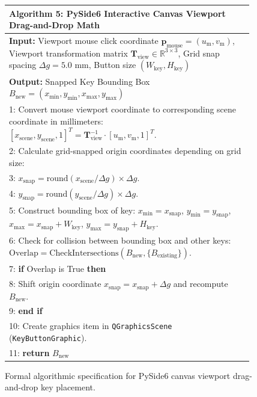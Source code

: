 \begin{figure}[htbp]
\centering
\begin{minipage}{0.92\textwidth}
\small
\setlength{\extrarowheight}{2pt}
\begin{tabular}{|p{0.96\linewidth}|}
\hline
\textbf{Algorithm 5: PySide6 Interactive Canvas Viewport Drag-and-Drop Math} \\
\hline
{\small\sffamily \textbf{Input:} Viewport mouse click coordinate $\mathbf{p}_{\text{mouse}} = (u_{\text{m}}, v_{\text{m}})$, Viewport transformation matrix $\mathbf{T}_{\text{view}} \in \mathbb{R}^{3 \times 3}$, Grid snap spacing $\Delta g = 5.0\text{ mm}$, Button size $(W_{\text{key}}, H_{\text{key}})$} \\
{\small\sffamily \textbf{Output:} Snapped Key Bounding Box $B_{\text{new}} = (x_{\min}, y_{\min}, x_{\max}, y_{\max})$} \\
{\small 1: Convert mouse viewport coordinate to corresponding scene coordinate in millimeters: $[x_{\text{scene}}, y_{\text{scene}}, 1]^T = \mathbf{T}_{\text{view}}^{-1} \cdot [u_{\text{m}}, v_{\text{m}}, 1]^T$.} \\
{\small 2: Calculate grid-snapped origin coordinates depending on grid size:} \\
{\small 3: \hspace{1em} $x_{\text{snap}} = \text{round}(x_{\text{scene}} / \Delta g) \times \Delta g$.} \\
{\small 4: \hspace{1em} $y_{\text{snap}} = \text{round}(y_{\text{scene}} / \Delta g) \times \Delta g$.} \\
{\small 5: Construct bounding box of key: $x_{\min} = x_{\text{snap}}$, $y_{\min} = y_{\text{snap}}$, $x_{\max} = x_{\text{snap}} + W_{\text{key}}$, $y_{\max} = y_{\text{snap}} + H_{\text{key}}$.} \\
{\small 6: Check for collision between bounding box and other keys: $\text{Overlap} = \text{CheckIntersections}(B_{\text{new}}, \{B_{\text{existing}}\})$.} \\
{\small 7: \textbf{if} Overlap is True \textbf{then}} \\
{\small 8: \hspace{1em} Shift origin coordinate $x_{\text{snap}} = x_{\text{snap}} + \Delta g$ and recompute $B_{\text{new}}$.} \\
{\small 9: \textbf{end if}} \\
{\small 10: Create graphics item in \texttt{QGraphicsScene} (\texttt{KeyButtonGraphic}).} \\
{\small 11: \textbf{return} $B_{\text{new}}$} \\
\hline
\end{tabular}
\end{minipage}
\caption{Formal algorithmic specification for PySide6 canvas viewport drag-and-drop key placement.}
\label{alg:canvas_drag_drop}
\end{figure}

